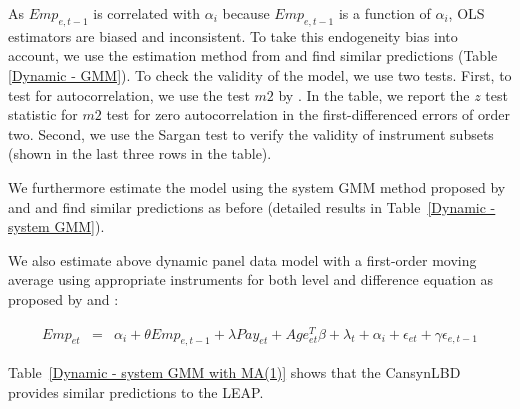 As $Emp_{e,t-1}$ is correlated with $\alpha_{i}$ because $Emp_{e,t-1}$ is a function of $\alpha_{i}$, 
OLS estimators are biased and inconsistent. 
To take this endogeneity bias into account, we use the estimation method from \textcite{RePEc:oup:restud:v:58:y:1991:i:2:p:277-297.} and find similar predictions (Table \ref{Dynamic - GMM}). To check the validity of the model, we use two tests. First, to test for autocorrelation, we use the test $m2$ by \textcite{RePEc:oup:restud:v:58:y:1991:i:2:p:277-297.}. In the table, we report the $z$ test statistic for $m2$ test for zero autocorrelation in the  first-differenced errors of order two. Second, we use the Sargan test to verify the validity of instrument subsets (shown in the last three rows in the table).

We furthermore estimate the model using the system GMM  method proposed by \textcite{RePEc:eee:econom:v:68:y:1995:i:1:p:29-51} and \textcite{RePEc:eee:econom:v:87:y:1998:i:1:p:115-143} and find similar predictions as before (detailed results in Table~\ref{Dynamic - system GMM}). 

We also estimate above dynamic panel data model with a first-order moving average using appropriate instruments for both level and difference equation as proposed by \textcite{RePEc:eee:econom:v:68:y:1995:i:1:p:29-51} and \textcite{RePEc:eee:econom:v:87:y:1998:i:1:p:115-143}:

\begin{eqnarray}	
Emp_{et}&=&\alpha_i +\theta Emp_{e,t-1}+\lambda Pay_{et}+Age_{et}^{T}\beta+\lambda_t+\alpha_i+\epsilon_{et}+\gamma\epsilon_{e,t-1}
\end{eqnarray}

Table~\ref{Dynamic - system GMM with MA(1)} shows that the CansynLBD provides similar predictions to the LEAP.

